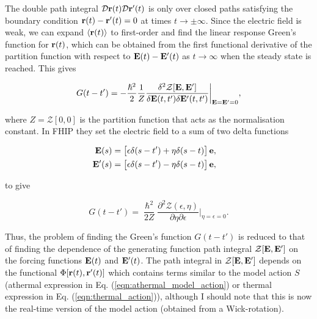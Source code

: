 The double path integral $\mathcal{D}\vb{r}(t) \mathcal{D}\vb{r'}(t)$ is only over closed paths satisfying the boundary condition $\vb{r}(t) - \vb{r'}(t) = 0$ at times $t \to \pm \infty$. Since the electric field is weak, we can expand $\langle \vb{r} (t) \rangle$ to first-order and find the linear response Green's function for $\vb{r}(t)$, which can be obtained from the first functional derivative of the partition function with respect to $\vb{E}(t) - \vb{E'}(t)$ as $t \to \infty$ when the steady state is reached. This gives

\begin{equation}
    G(t - t') = - \frac{\hslash^2}{2} \frac{1}{Z} \frac{\delta^2 \mathcal{Z}[\vb{E}, \vb{E'}]}{\delta \vb{E}(t, t') \delta \vb{E'}(t, t')} \biggr\rvert_{\vb{E}=\vb{E'} = 0},
\end{equation}

where $Z = \mathcal{Z}[0, 0]$ is the partition function that acts as the normalisation constant. In FHIP they set the electric field to a sum of two delta functions

\begin{subequations}
    \begin{align}
        \begin{split}
            \vb{E}(s) &= \left[\epsilon \delta(s - t') + \eta \delta(s - t)\right] \vb{e},
        \end{split}\\
        \begin{split}
            \vb{E'}(s) &= \left[\epsilon \delta(s - t') - \eta \delta(s - t)\right] \vb{e},
        \end{split}
    \end{align}
\end{subequations}

to give

\begin{equation}
    G(t - t') = \frac{\hslash^2}{2Z}\frac{\partial^2 \mathcal{Z}(\epsilon, \eta)}{\partial\eta\partial\epsilon} \biggr\rvert_{\eta=\epsilon=0}.
\end{equation}

Thus, the problem of finding the Green's function $G(t - t')$ is reduced to that of finding the dependence of the generating function path integral $\mathcal{Z[\vb{E}, \vb{E'}]}$ on the forcing functions $\vb{E}(t)$ and $\vb{E'}(t)$. The path integral in $\mathcal{Z[\vb{E}, \vb{E'}]}$ depends on the functional $\Phi[\vb{r}(t), \vb{r'}(t)]$ which contains terms similar to the model action $S$ (athermal expression in Eq. (\ref{eqn:athermal_model_action}) or thermal expression in Eq. (\ref{eqn:thermal_action})), although I should note that this is now the real-time version of the model action (obtained from a Wick-rotation). 

